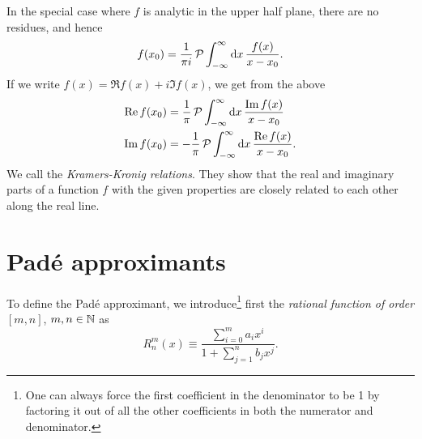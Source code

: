 In the special case where $f$ is analytic in the upper half plane,
there are no residues, and hence
\begin{equation}
  f(x_0)=\frac{1}{\pi i}\,\mathcal{P}
     \int_{-\infty}^{\infty}\dd{x}\frac{f(x)}{x-x_0}.
\end{equation}
If we write $f(x)=\Re f(x)+i\Im f(x)$, we get from the above
\begin{equation}\begin{aligned}\label{eq:kramerKronig}
\mathop{\mathrm{Re}} f(x_0)&=\frac{1}{\pi}\,\mathcal{P}
     \int_{-\infty}^{\infty}\dd{x}\frac{\mathop{\mathrm{Im}} f(x)}{x-x_0}\\
\mathop{\mathrm{Im}} f(x_0)&=-\frac{1}{\pi}\,\mathcal{P}
     \int_{-\infty}^{\infty}\dd{x}\frac{\mathop{\mathrm{Re}} f(x)}{x-x_0}.
\end{aligned}\end{equation}
We call  the 
{\it Kramers-Kronig relations}.
They show that the real and imaginary parts of a function $f$ with the given
properties are closely related to each other along the real line.



\section{Pad\'e approximants}

To define the Pad\'e approximant, we introduce\footnote{One can always force
the first coefficient in the denominator to be 1 by factoring it out of all
the other coefficients in both the numerator and denominator.} first the {\it rational
function of order} $[m,n]$, $m,n\in\mathbb{N}$ as 
\begin{equation}
  R_n^m(x)\equiv\frac{\sum_{i=0}^m a_ix^i}{1+\sum_{j=1}^nb_jx^j}.
\end{equation}




